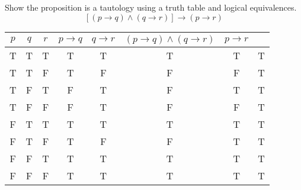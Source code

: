 \documentclass[12pt,addpoints]{exam}
\newcommand{\ra}{\rightarrow}
\newcommand{\xor}{\oplus}
\begin{document}
\begin{questions}
\begin{solution}
    \end{solution}


\question Show the proposition is a tautology using a truth table
and logical equivalences.
 \[ [(p \rightarrow q) \wedge (q \rightarrow r)] \rightarrow (p \rightarrow r) \]
    \ifprintanswers
        \vspace{-25pt}
    \fi
    \begin{solution}

    \begin{tabular}{|c|c|c||ccccc|}
        $p$ & $q$ & $r$ & $p \ra q$ & $q \ra r$ & $(p \ra q) \wedge (q \ra r)$ & $p \ra r$ &  \\
        \hline
        T & T & T & T & T & T & T & T \\
        T & T & F & T & F & F & F & T \\
        T & F & T & F & T & F & T & T \\
        T & F & F & F & T & F & F & T \\
        F & T & T & T & T & T & T & T \\
        F & T & F & T & F & F & T & T \\
        F & F & T & T & T & T & T & T \\
        F & F & F & T & T & T & T & T \\
    \end{tabular}


\end{solution}
\end{questions}
\end{document}
